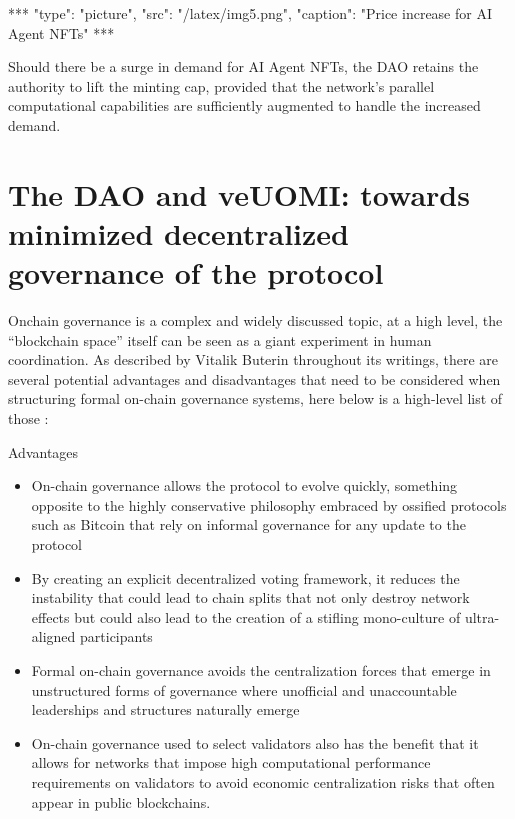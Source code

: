 \documentclass{article}
\begin{document}
***
"type": "picture",
"src": "/latex/img5.png",
"caption": "Price increase for AI Agent NFTs"
***


Should there be a surge in demand for AI Agent NFTs, the DAO retains the authority to lift the minting cap, provided that the network's parallel computational capabilities are sufficiently augmented to handle the increased demand.






\section{The DAO and veUOMI:  towards minimized decentralized governance of the protocol
}

Onchain governance is a complex and widely discussed topic, at a high level, the “blockchain space” itself can be seen as a giant experiment in human coordination. As described by Vitalik Buterin throughout its writings, there are several potential advantages and disadvantages that need to be considered when structuring formal on-chain governance systems, here below is a high-level list of those :

Advantages 

\begin{itemize}

\item On-chain governance allows the protocol to evolve quickly, something opposite to the highly conservative philosophy embraced by ossified protocols such as Bitcoin that rely on informal governance for any update to the protocol

\item By creating an explicit decentralized voting framework, it reduces the instability that could lead to chain splits that not only destroy network effects but could  also lead to the creation of a stifling mono-culture of ultra-aligned participants 

\item Formal on-chain governance avoids the centralization forces that emerge in  unstructured forms of governance where unofficial and unaccountable leaderships and structures naturally emerge

\item On-chain governance used to select validators also has the benefit that it allows for networks that impose high computational performance requirements on validators to avoid economic centralization risks that often appear in public blockchains.

\end{itemize}
\end{document}
